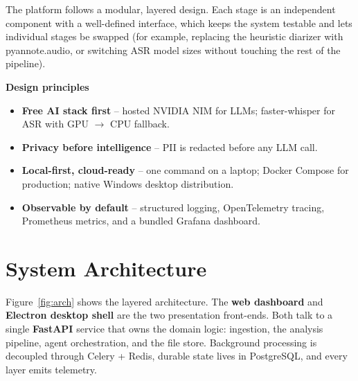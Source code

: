\documentclass[11pt,a4paper]{article}
\begin{document}
The platform follows a modular, layered design. Each stage is an independent component
with a well-defined interface, which keeps the system testable and lets individual stages
be swapped (for example, replacing the heuristic diarizer with pyannote.audio, or switching
ASR model sizes without touching the rest of the pipeline).

\begin{highlight}
\textbf{Design principles}
\begin{itemize}
  \item \textbf{Free AI stack first} -- hosted NVIDIA NIM for LLMs; faster-whisper for ASR
        with GPU $\rightarrow$ CPU fallback.
  \item \textbf{Privacy before intelligence} -- PII is redacted before any LLM call.
  \item \textbf{Local-first, cloud-ready} -- one command on a laptop; Docker Compose for
        production; native Windows desktop distribution.
  \item \textbf{Observable by default} -- structured logging, OpenTelemetry tracing,
        Prometheus metrics, and a bundled Grafana dashboard.
\end{itemize}
\end{highlight}

\section{System Architecture}

Figure~\ref{fig:arch} shows the layered architecture. The \textbf{web dashboard} and
\textbf{Electron desktop shell} are the two presentation front-ends. Both talk to a single
\textbf{FastAPI} service that owns the domain logic: ingestion, the analysis pipeline,
agent orchestration, and the file store. Background processing is decoupled through
Celery + Redis, durable state lives in PostgreSQL, and every layer emits telemetry.
\end{document}
